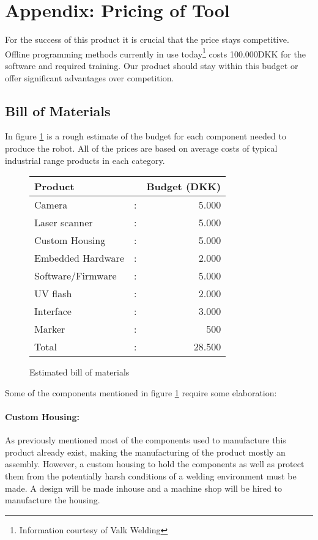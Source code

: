 \section{Appendix: Pricing of Tool}
\label{app:priceofProduct}
For the success of this product it is crucial that the price stays competitive. Offline programming methods currently in use today\footnote{Information courtesy of Valk Welding} costs 100.000DKK for the software and required training. Our product should stay within this budget or offer significant advantages over competition.
\subsection{Bill of Materials}
In figure \ref{tab:BoM} is a rough estimate of the budget for each component needed to produce the robot. All of the prices are based on average costs of typical industrial range products in each category.  

\begin{figure}[h]
	\begin{center}
		\begin{tabular}{l c r}
		Product            & & Budget (DKK)\\
		\hline
		Camera 				& : & 5.000  \\
		Laser scanner		& : & 5.000 \\
		Custom Housing		& : & 5.000\\
		Embedded Hardware	& : & 2.000\\
		Software/Firmware	& : & 5.000\\
		UV flash			& : & 2.000\\
		Interface			& : & 3.000\\
		Marker				& : & 500\\[0.2cm]
		\hline
		Total				& : & 28.500\\ 
		\end{tabular}
	\end{center}
	\caption{Estimated bill of materials}
\label{tab:BoM}
\end{figure}
Some of the components mentioned in figure \ref{tab:BoM} require some elaboration:
\paragraph{Custom Housing:}
As previously mentioned most of the components used to manufacture this product already exist, making the manufacturing of the product mostly an assembly. However, a custom housing to hold the components as well as protect them from the potentially harsh conditions of a welding environment must be made. A design will be made inhouse and a machine shop will be hired to manufacture the housing.
